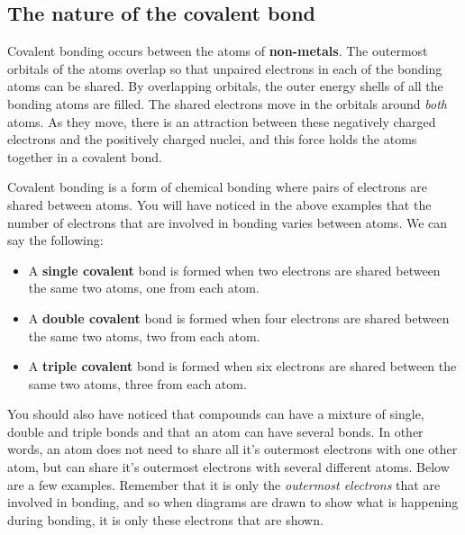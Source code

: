             \subsection*{The nature of the covalent bond}
            \nopagebreak
        \label{m38704*id138956}Covalent bonding occurs between the atoms of \textbf{non-metals}. The outermost orbitals of the atoms overlap so that unpaired electrons in each of the bonding atoms can be shared. By overlapping orbitals, the outer energy shells of all the bonding atoms are filled. The shared electrons move in the orbitals around \textsl{both} atoms. As they move, there is an attraction between these negatively charged electrons and the positively charged nuclei, and this force holds the atoms together in a covalent bond.\par 
\label{m38704*fhsst!!!underscore!!!id94}
 { \label{m38704*meaningfhsst!!!underscore!!!id94}
Covalent bonding is a form of chemical bonding where pairs of electrons are shared between atoms.} 
\label{m38704*id139505}You will have noticed in the above examples that the number of electrons that are involved in bonding varies between atoms. We can say the following:
\begin{itemize}
 \item A \textbf{single covalent} bond is formed when two electrons are shared between the same two atoms, one from each atom. 
 \item A \textbf{double covalent} bond is formed when four electrons are shared between the same two atoms, two from each atom.
 \item A \textbf{triple covalent} bond is formed when six electrons are shared between the same two atoms, three from each atom.
\end{itemize}
You should also have noticed that compounds can have a mixture of single, double and triple bonds and that an atom can have several bonds. In other words, an atom does not need to share all it's outermost electrons with one other atom, but can share it's outermost electrons with several different atoms.
\label{m38704*id138991}Below are a few examples. Remember that it is only the \textsl{outermost electrons} that are involved in bonding, and so when diagrams are drawn to show what is happening during bonding, it is only these electrons that are shown. \par 
\label{m38704*secfhsst!!!underscore!!!id98}\vspace{.5cm} 
